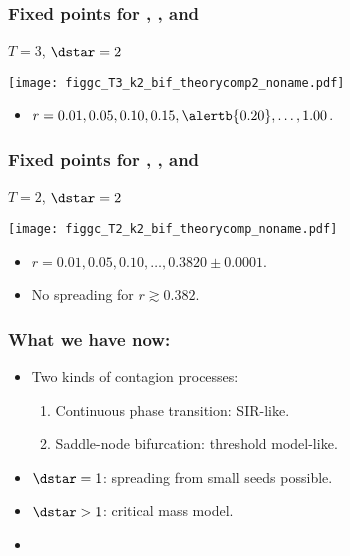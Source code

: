\begin{frame}
  \frametitle{Fixed points for , , and }

  \begin{block}{$T=3$, $\dstar=2$}
  \begin{center}
      \texttt{[image: figgc\_T3\_k2\_bif\_theorycomp2\_noname.pdf]}
      \begin{itemize}
      \item 
        $r=0.01, 0.05, 0.10, 0.15, \alertb{0.20},\ldots, 1.00$.
      \end{itemize}
  \end{center}
  \end{block}

\end{frame}

\begin{frame}
  \frametitle{Fixed points for , , and }

  \begin{block}{$T=2$, $\dstar=2$}
  \begin{center}
      \texttt{[image: figgc\_T2\_k2\_bif\_theorycomp\_noname.pdf]}
      \begin{itemize}
      \item 
        $r=0.01, 0.05, 0.10,\ldots, 0.3820 \pm 0.0001$.
      \item<2-> 
        No spreading for $r \gtrsim 0.382$.
      \end{itemize}
  \end{center}
  \end{block}

\end{frame}

\begin{frame}
  \frametitle{What we have now:}
  
  \begin{itemize}
  \item 
    Two kinds of contagion processes:
    \begin{enumerate}
    \item<2-> 
      Continuous phase transition: \alert{SIR-like}.
    \item<3-> 
      Saddle-node bifurcation: \alert{threshold model-like}.
    \end{enumerate}
  \item<4->
    \alert{$\dstar=1$:} spreading from small seeds possible.
  \item<5->
    \alert{$\dstar>1$:} critical mass model.
  \item<6->
  \end{itemize}

\end{frame}


